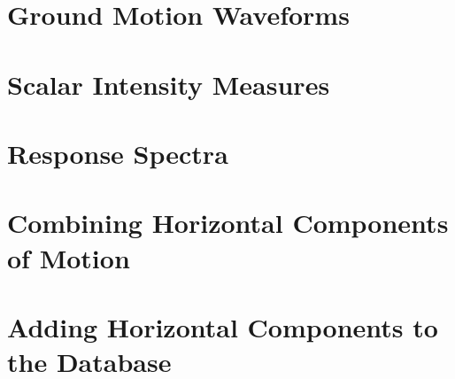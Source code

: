 \section{Ground Motion Waveforms}
\label{sec:ims}

\section{Scalar Intensity Measures}
\label{sec:scalar_ims}

\section{Response Spectra}
\label{sec:response_spectra}

\section{Combining Horizontal Components of Motion}
\label{sec:horizontal}

\section{Adding Horizontal Components to the Database}